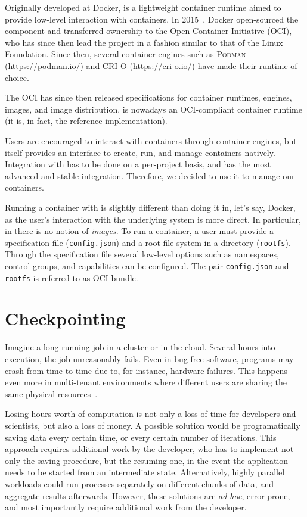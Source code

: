 Originally developed at Docker, \runc is a lightweight container runtime aimed to provide low-level interaction with containers.
In 2015~\cite{introducing-runc}, Docker open-sourced the component and transferred ownership to the Open Container Initiative (OCI), who has since then lead the project in a fashion similar to that of the Linux Foundation.
Since then, several container engines such as \textsc{Podman} (\url{https://podman.io/}) and \textsc{CRI-O} (\url{https://cri-o.io/}) have made \runc their runtime of choice.

The OCI has since then released specifications for container runtimes, engines, images, and image distribution.
\runc is nowadays an OCI-compliant container runtime (it is, in fact, the reference implementation).

Users are encouraged to interact with containers through container engines, but \runc itself provides an interface to create, run, and manage containers natively.
Integration with \criu has to be done on a per-project basis, and \runc has the most advanced and stable integration.
Therefore, we decided to use it to manage our containers.

Running a container with \runc is slightly different than doing it in, let's say, Docker, as the user's interaction with the underlying system is more direct.
In particular, in \runc there is no notion of \textit{images}.
To run a container, a user must provide a specification file (\texttt{config.json}) and a root file system in a directory (\texttt{rootfs}).
Through the specification file several low-level options such as namespaces, control groups, and capabilities can be configured.
The pair \texttt{config.json} and \texttt{rootfs} is referred to as OCI bundle.

\section{Checkpointing} \label{sec:bg-cp}

Imagine a long-running job in a cluster or in the cloud.
Several hours into execution, the job unreasonably fails.
Even in bug-free software, programs may crash from time to time due to, for instance, hardware failures.
This happens even more in multi-tenant environments where different users are sharing the same physical resources~\cite{Barker2014}.

Losing hours worth of computation is not only a loss of time for developers and scientists, but also a loss of money.
A possible solution would be programatically saving data every certain time, or every certain number of iterations.
This approach requires additional work by the developer, who has to implement not only the saving procedure, but the resuming one, in the event the application needs to be started from an intermediate state.
Alternatively, highly parallel workloads could run processes separately on different chunks of data, and aggregate results afterwards.
However, these solutions are \textit{ad-hoc}, error-prone, and most importantly require additional work from the developer.

